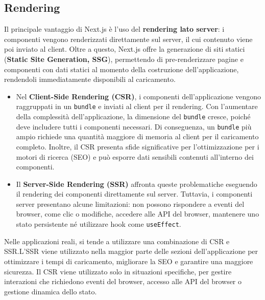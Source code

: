 \documentclass[target=bach,aauheader=,style=]{thud}
\begin{document}
\subsection{Rendering}
Il principale vantaggio di Next.js è l'uso del \textbf{rendering lato server}: i componenti vengono renderizzati direttamente sul server, il cui contenuto viene poi inviato al client. Oltre a questo, Next.js offre la generazione di siti statici (\textbf{Static Site Generation, SSG}), permettendo di pre-renderizzare pagine e componenti con dati statici al momento della costruzione dell'applicazione, rendendoli immediatamente disponibili al caricamento.

\begin{itemize}
    \item Nel \textbf{Client-Side Rendering (CSR)}, i componenti dell'applicazione vengono raggruppati in un \texttt{bundle} e inviati al client per il rendering. Con l'aumentare della complessità dell'applicazione, la dimensione del \texttt{bundle} cresce, poiché deve includere tutti i componenti necessari. Di conseguenza, un \texttt{bundle} più ampio richiede una quantità maggiore di memoria al client per il caricamento completo. Inoltre, il CSR presenta sfide significative per l'ottimizzazione per i motori di ricerca (SEO) e può esporre dati sensibili contenuti all'interno dei componenti.

    \item Il \textbf{Server-Side Rendering (SSR)} affronta queste problematiche eseguendo il rendering dei componenti direttamente sul server. Tuttavia, i componenti server presentano alcune limitazioni: non possono rispondere a eventi del browser, come clic o modifiche, accedere alle API del browser, mantenere uno stato persistente né utilizzare hook come \texttt{useEffect}.
\end{itemize}

\noindent Nelle applicazioni reali, si tende a utilizzare una combinazione di CSR e SSR.L'SSR viene utilizzato nella maggior parte delle sezioni dell'applicazione per ottimizzare i tempi di caricamento, migliorare la SEO e garantire una maggiore sicurezza. Il CSR viene utilizzato solo in situazioni specifiche, per gestire interazioni che richiedono eventi del browser, accesso alle API del browser o gestione dinamica dello stato.
\end{document}
